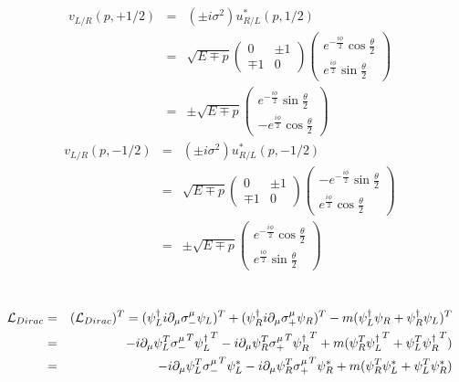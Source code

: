 \documentclass[11pt]{article}
\def\del{{\partial}}
\begin{document}
\section{ }
\begin{eqnarray}
    v_{L/R}(p,+1/2)&=&(\pm i\sigma^2)u_{R/L}^*(p,1/2) \\
    &=& \sqrt{E\mp p}
    \begin{pmatrix}
        0 & \pm 1 \\
        \mp 1 & 0
    \end{pmatrix}
    \begin{pmatrix}
        e^{-\frac{i\phi}{2}} \cos \frac{\theta}{2} \\
        e^{\frac{i\phi}{2}} \sin \frac{\theta}{2}
    \end{pmatrix}\\
    &=& \pm \sqrt{E\mp p}
    \begin{pmatrix}
        e^{-\frac{i\phi}{2}} \sin \frac{\theta}{2} \\
        -e^{\frac{i\phi}{2}} \cos \frac{\theta}{2}
    \end{pmatrix}
\end{eqnarray}
\begin{eqnarray}
    v_{L/R}(p,-1/2)&=&(\pm i\sigma^2)u_{R/L}^*(p,-1/2) \\
    &=& \sqrt{E\mp p}
    \begin{pmatrix}
        0 & \pm 1 \\
        \mp 1 & 0
    \end{pmatrix}
    \begin{pmatrix}
        -e^{-\frac{i\phi}{2}} \sin \frac{\theta}{2} \\
        e^{\frac{i\phi}{2}} \cos \frac{\theta}{2}
    \end{pmatrix}\\
    &=& \pm \sqrt{E\mp p}
    \begin{pmatrix}
        e^{-\frac{i\phi}{2}} \cos \frac{\theta}{2} \\
        e^{\frac{i\phi}{2}} \sin \frac{\theta}{2}
    \end{pmatrix}
\end{eqnarray}

\section{ }
\begin{eqnarray}
    {\cal L}_{Dirac} &=& (  {\cal L}_{Dirac} )^T
    = ( \psi_L^\dagger i\del_\mu \sigma_-^\mu \psi_L )^T
    + ( \psi_R^\dagger i\del_\mu \sigma_+^\mu \psi_R )^T
    - m ( \psi_L^\dagger \psi_R + \psi_R^\dagger \psi_L )^T\\ 
    &=& - i\del_\mu \psi_L^T{\sigma_-^\mu}^T {\psi_L^\dagger}^T - i\del_\mu \psi_R^T{\sigma_+^\mu}^T {\psi_R^\dagger}^T
    + m( \psi_R^T {\psi_L^\dagger}^T + \psi_L^T {\psi_R^\dagger}^T )\\
    &=& - i\del_\mu \psi_L^T{\sigma_-^\mu}^T \psi_L^*
    - i\del_\mu \psi_R^T {\sigma_+^\mu}^T \psi_R^*
    + m( \psi_R^T \psi_L^* + \psi_L^T \psi_R^* )
\end{eqnarray}
\end{document}
